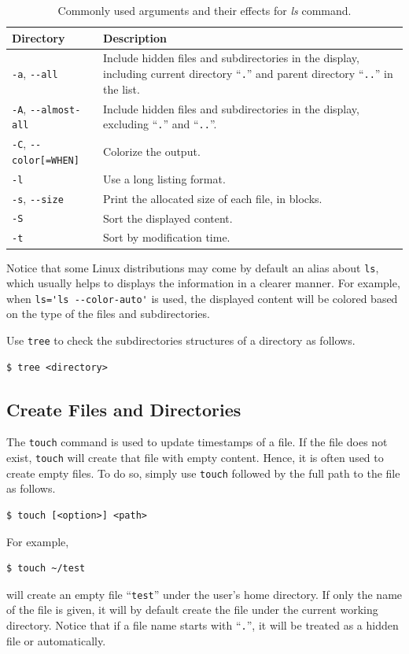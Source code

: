 \begin{table}[!htb]
  \centering \caption{Commonly used arguments and their effects for \textit{ls} command.}\label{ch:fm:tab:lscommandargument}
  \begin{tabularx}{\textwidth}{lX}
    \hline
    Directory & Description \\ \hline
    \verb|-a|, \verb|--all| & Include hidden files and subdirectories in the display, including current directory ``\verb|.|'' and parent directory ``\verb|..|'' in the list. \\ 
    \verb|-A|, \verb|--almost-all| & Include hidden files and subdirectories in the display, excluding ``\verb|.|'' and ``\verb|..|''. \\ 
    \verb|-C|, \verb|--color[=WHEN]| & Colorize the output. \\ 
    \verb|-l| & Use a long listing format. \\ 
    \verb|-s|, \verb|--size| & Print the allocated size of each file, in blocks. \\ 
    \verb|-S| & Sort the displayed content. \\ 
    \verb|-t| & Sort by modification time. \\
    \hline
  \end{tabularx}
\end{table}

Notice that some Linux distributions may come by default an alias about \verb|ls|, which usually helps to displays the information in a clearer manner. For example, when \verb|ls='ls --color-auto'| is used, the displayed content will be colored based on the type of the files and subdirectories.

Use \verb|tree| to check the subdirectories structures of a directory as follows.
\begin{lstlisting}
$ tree <directory>
\end{lstlisting}

\subsection{Create Files and Directories}

The \verb|touch| command is used to update timestamps of a file. If the file does not exist, \verb|touch| will create that file with empty content. Hence, it is often used to create empty files. To do so, simply use \verb|touch| followed by the full path to the file as follows.
\begin{lstlisting}
$ touch [<option>] <path>
\end{lstlisting}
For example,
\begin{lstlisting}
$ touch ~/test
\end{lstlisting}
will create an empty file ``\texttt{test}'' under the user's home directory. If only the name of the file is given, it will by default create the file under the current working directory. Notice that if a file name starts with ``\verb|.|'', it will be treated as a hidden file or automatically.

